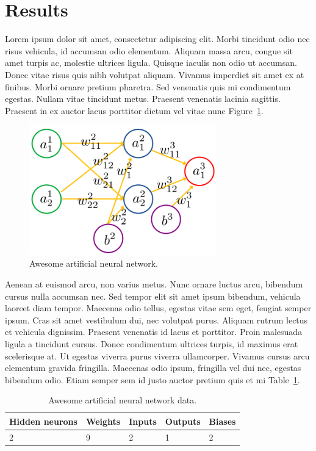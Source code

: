 \documentclass[onecolumn]{miniclass}
\begin{document}
\section{Results}
Lorem ipsum dolor sit amet, consectetur adipiscing elit. Morbi tincidunt odio nec risus vehicula, id accumsan odio elementum. Aliquam massa arcu, congue sit amet turpis ac, molestie ultrices ligula. Quisque iaculis non odio ut accumsan. Donec vitae risus quis nibh volutpat aliquam. Vivamus imperdiet sit amet ex at finibus. Morbi ornare pretium pharetra. Sed venenatis quis mi condimentum egestas. Nullam vitae tincidunt metus. Praesent venenatis lacinia sagittis. Praesent in ex auctor lacus porttitor dictum vel vitae nunc Figure~\ref{fig:ann}.


\begin{figure}[]
    \centering
    \includegraphics[width=230pt]{resources/ann.png}
    \caption{Awesome artificial neural network.}
    \label{fig:ann}
\end{figure}

Aenean at euismod arcu, non varius metus. Nunc ornare luctus arcu, bibendum cursus nulla accumsan nec. Sed tempor elit sit amet ipsum bibendum, vehicula laoreet diam tempor. Maecenas odio tellus, egestas vitae sem eget, feugiat semper ipsum. Cras sit amet vestibulum dui, nec volutpat purus. Aliquam rutrum lectus et vehicula dignissim. Praesent venenatis id lacus et porttitor. Proin malesuada ligula a tincidunt cursus. Donec condimentum ultrices turpis, id maximus erat scelerisque at. Ut egestas viverra purus viverra ullamcorper. Vivamus cursus arcu elementum gravida fringilla. Maecenas odio ipsum, fringilla vel dui nec, egestas bibendum odio. Etiam semper sem id justo auctor pretium quis et mi Table~\ref{tab:ann_arch}.

\begin{table}[]
    \centering
    \begin{tabular}{|l|l|l|l|l|}
        \hline
        Hidden neurons & Weights & Inputs & Outputs & Biases \\ \hline
        2              & 9       & 2      & 1       & 2      \\ \hline
    \end{tabular}
    \caption{Awesome artificial neural network data.}
    \label{tab:ann_arch}
\end{table}
\end{document}
